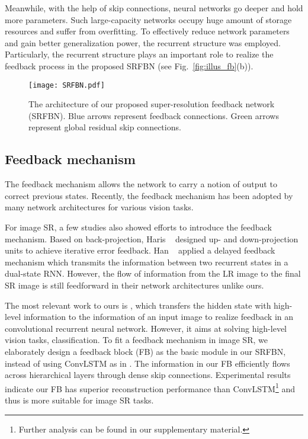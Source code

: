 \documentclass[10pt,twocolumn,letterpaper]{article}
\begin{document}
	Meanwhile, with the help of skip connections, neural networks go deeper and hold more parameters. Such large-capacity networks occupy huge amount of storage resources and suffer from overfitting. To effectively reduce network parameters and gain better generalization power, the recurrent structure was employed\cite{Kim_2016_CVPR_DRCN, Tai_2017_CVPR, tai2017memnet}. Particularly, the recurrent structure plays an important role to realize the feedback process in the proposed SRFBN (see Fig.~\ref{fig:illus_fb}(b)). 
	
	\begin{figure*}
		\centering
\texttt{[image: SRFBN.pdf]}
		\caption{The architecture of our proposed super-resolution feedback network (SRFBN). Blue arrows represent feedback connections. Green arrows represent global residual skip connections.}
		\label{SRFBN}
	\end{figure*}
	
	\subsection{Feedback mechanism}
	The feedback mechanism allows the network to carry a notion of output to correct previous states. Recently, the feedback mechanism has been adopted by many network architectures for various vision tasks\cite{Carreira2015Human, DBLP:conf/iccv/CaoLYYWWHWHXRH15, Zamir_2017_CVPR, Haris_2018_CVPR, Han_2018_CVPR, DBLP:conf/aaai/SamB18}.
	
	For image SR, a few studies also showed efforts to introduce the feedback mechanism. Based on back-projection, Haris \etal~\cite{Haris_2018_CVPR} designed up- and down-projection units to achieve iterative error feedback. Han \etal~\cite{Han_2018_CVPR} applied a delayed feedback mechanism which transmits the information between two recurrent states in a dual-state RNN. However, the flow of information from the LR image to the final SR image is still feedforward in their network architectures unlike ours. 
	
	The most relevant work to ours is \cite{Zamir_2017_CVPR}, which transfers the hidden state with high-level information to the information of an input image to realize feedback in an convolutional recurrent neural network. However, it aims at solving high-level vision tasks, \eg classification. To fit a feedback mechanism in image SR, we elaborately design a feedback block (FB) as the basic module in our SRFBN, instead of using ConvLSTM as in \cite{Zamir_2017_CVPR}. The information in our FB efficiently flows across hierarchical layers through dense skip connections. Experimental results indicate our FB has superior reconstruction performance than ConvLSTM\footnote{Further analysis can be found in our supplementary material.} and thus is more suitable for image SR tasks.
	
\end{document}
